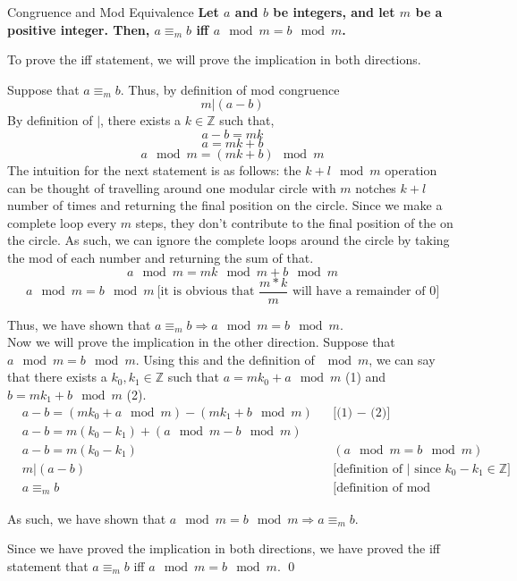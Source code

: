 \documentclass[11pt, nopagenumbers]{adamblan-hw}
\begin{document}
    \begin{question}{\color{red} Congruence and Mod Equivalence}
        \textbf{Let $a$ and $b$ be integers, and let $m$ be a positive integer. Then, $a \equiv_m b$ iff $a \mod m = b \mod m$.}

        To prove the iff statement, we will prove the implication in both directions.
        
        Suppose that $a \equiv_m b$. Thus, by definition of mod congruence 
        $$m | (a-b)$$
        By definition of $|$, there exists a $k \in \mathbb{Z}$ such that,
        $$a - b = mk$$
        $$a = mk + b$$
        $$a \mod m = (mk + b) \mod m$$ 
        The intuition for the next statement is as follows: the $k + l \mod m$ operation can be thought
        of travelling around one modular circle with $m$ notches $k + l$ number of times and returning the
        final position on the circle. Since we make a complete loop every $m$ steps, they don't contribute
        to the final position of the on the circle. As such, we can ignore the complete loops around the circle
        by taking the mod of each number and returning the sum of that.
        $$a\mod m = mk \mod m + b \mod m$$
        $$a \mod m = b \mod m \ \text{[it is obvious that $\frac{m * k}{m}$ will have a remainder of 0]}$$

        Thus, we have shown that $a \equiv_m b \Rightarrow a \mod m = b \mod m$.\\

        Now we will prove the implication in the other direction. Suppose that $a \mod m = b \mod m$.
        Using this and the definition of $\mod m$, we can say that there exists a $k_0, k_1 \in \mathbb{Z}$
        such that $a = mk_0 + a \mod m$ (1) and $b = mk_1 + b \mod m$ (2).
        \begin{align*}
        &a - b = (mk_0 + a \mod m) - (mk_1 + b \mod m)&& \text{[(1) $-$ (2)]} \\
        &a - b = m(k_0 - k_1) + (a \mod m - b \mod m) \\
        &a - b = m(k_0 - k_1) && (a \mod m = b \mod m)\\
        &m | (a - b) && \text{[definition of | since $k_0 - k_1 \in \mathbb{Z}$]}\\
        &a \equiv_m b && \text{[definition of mod congruence]}
        \end{align*}

        As such, we have shown that $a \mod m = b \mod m \Rightarrow a \equiv_m b$.

        Since we have proved the implication in both directions, we have proved the iff
        statement that $a \equiv_m b$ iff $a \mod m = b \mod m$.
        \qed
    \end{question}
\end{document}
